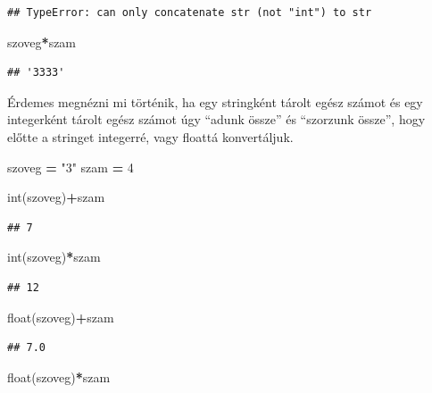 \documentclass[
]{book}
\newenvironment{Shaded}{\begin{snugshade}}{\end{snugshade}}
\newcommand{\BuiltInTok}[1]{#1}
\newcommand{\DecValTok}[1]{\textcolor[rgb]{0.00,0.00,0.81}{#1}}
\newcommand{\NormalTok}[1]{#1}
\newcommand{\OperatorTok}[1]{\textcolor[rgb]{0.81,0.36,0.00}{\textbf{#1}}}
\newcommand{\StringTok}[1]{\textcolor[rgb]{0.31,0.60,0.02}{#1}}
\begin{document}
\begin{verbatim}
## TypeError: can only concatenate str (not "int") to str
\end{verbatim}

\begin{Shaded}
\begin{Highlighting}[]
\NormalTok{szoveg}\OperatorTok{*}\NormalTok{szam}
\end{Highlighting}
\end{Shaded}

\begin{verbatim}
## '3333'
\end{verbatim}

Érdemes megnézni mi történik, ha egy stringként tárolt egész számot és egy integerként tárolt egész számot úgy ``adunk össze'' és ``szorzunk össze'', hogy előtte a stringet integerré, vagy floattá konvertáljuk.

\begin{Shaded}
\begin{Highlighting}[]
\NormalTok{szoveg }\OperatorTok{=} \StringTok{"3"}
\NormalTok{szam }\OperatorTok{=} \DecValTok{4}

\BuiltInTok{int}\NormalTok{(szoveg)}\OperatorTok{+}\NormalTok{szam}
\end{Highlighting}
\end{Shaded}

\begin{verbatim}
## 7
\end{verbatim}

\begin{Shaded}
\begin{Highlighting}[]
\BuiltInTok{int}\NormalTok{(szoveg)}\OperatorTok{*}\NormalTok{szam}
\end{Highlighting}
\end{Shaded}

\begin{verbatim}
## 12
\end{verbatim}

\begin{Shaded}
\begin{Highlighting}[]
\BuiltInTok{float}\NormalTok{(szoveg)}\OperatorTok{+}\NormalTok{szam}
\end{Highlighting}
\end{Shaded}

\begin{verbatim}
## 7.0
\end{verbatim}

\begin{Shaded}
\begin{Highlighting}[]
\BuiltInTok{float}\NormalTok{(szoveg)}\OperatorTok{*}\NormalTok{szam}
\end{Highlighting}
\end{Shaded}
\end{document}
